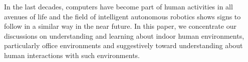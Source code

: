 \documentclass[letterpaper, 10 pt, conference]{ieeeconf}  %
\begin{document}
In the last decades, computers have become part of human activities in all avenues of 
life and the field of intelligent autonomous robotics shows signs to follow in a 
similar way in the near future. In this paper, we concentrate our discussions on 
understanding and learning about indoor human environments, particularly office 
environments and suggestively toward understanding about human interactions with such 
environments.

%


\end{document}

